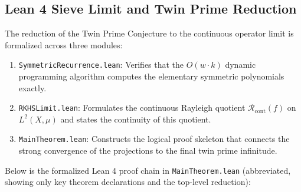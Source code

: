 \documentclass[10pt,twoside]{article}
\begin{document}
\subsection{Lean 4 Sieve Limit and Twin Prime Reduction}

The reduction of the Twin Prime Conjecture to the continuous operator limit is formalized across three modules:
\begin{enumerate}
    \item \texttt{SymmetricRecurrence.lean}: Verifies that the $O(w \cdot k)$ dynamic programming algorithm computes the elementary symmetric polynomials exactly.
    \item \texttt{RKHSLimit.lean}: Formulates the continuous Rayleigh quotient $\mathcal{R}_{\text{cont}}(f)$ on $L^2(X, \mu)$ and states the continuity of this quotient.
    \item \texttt{MainTheorem.lean}: Constructs the logical proof skeleton that connects the strong convergence of the projections to the final twin prime infinitude.
\end{enumerate}

Below is the formalized Lean 4 proof chain in \texttt{MainTheorem.lean} (abbreviated, showing only key theorem declarations and the top-level reduction):
\end{document}
